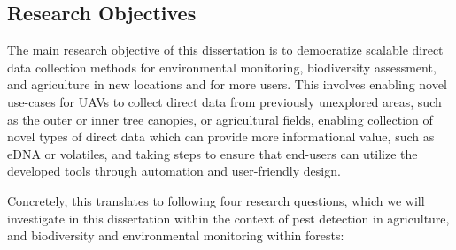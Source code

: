\subsection{Research Objectives}



The main research objective of this dissertation is to democratize scalable direct data collection methods for environmental monitoring, biodiversity assessment, and agriculture in new locations and for more users. This involves enabling novel use-cases for UAVs to collect direct data from previously unexplored areas, such as the outer or inner tree canopies, or agricultural fields, enabling collection of novel types of direct data which can provide more informational value, such as eDNA or volatiles, and taking steps to ensure that end-users can utilize the developed tools through automation and user-friendly design. 

Concretely, this translates to following four research questions, which we will investigate in this dissertation within the context of pest detection in agriculture, and biodiversity and environmental monitoring within forests:




